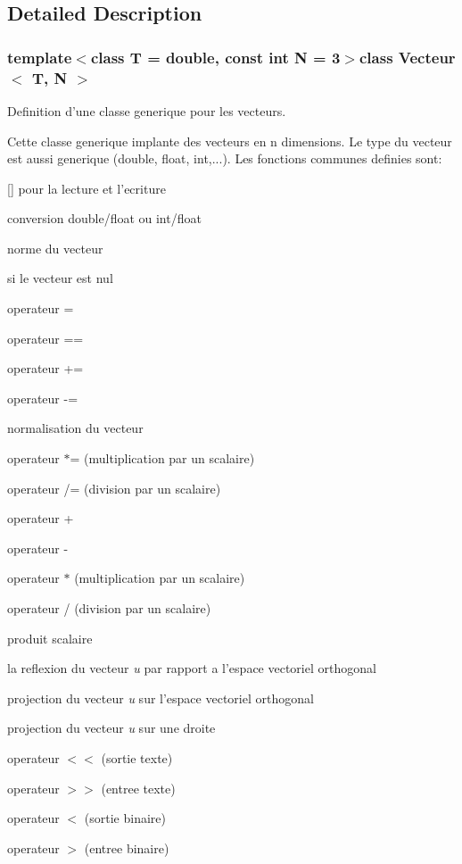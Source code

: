 \subsection{Detailed Description}
\subsubsection*{template$<$class T = double, const int N = 3$>$class Vecteur$<$ T, N $>$}

Definition d'une classe generique pour les vecteurs.

Cette classe generique implante des vecteurs en n dimensions. Le type du vecteur est aussi generique (double, float, int,...). Les fonctions communes definies sont\-:
\begin{DoxyItemize}
\item \mbox{[}\mbox{]} pour la lecture et l'ecriture
\item conversion double/float ou int/float
\item norme du vecteur
\item si le vecteur est nul
\item operateur =
\item operateur ==
\item operateur +=
\item operateur -\/=
\item normalisation du vecteur
\item operateur $\ast$= (multiplication par un scalaire)
\item operateur /= (division par un scalaire)
\item operateur +
\item operateur -\/
\item operateur $\ast$ (multiplication par un scalaire)
\item operateur / (division par un scalaire)
\item produit scalaire
\item la reflexion du vecteur {\itshape u} par rapport a l'espace vectoriel orthogonal
\item projection du vecteur {\itshape u} sur l'espace vectoriel orthogonal
\item projection du vecteur {\itshape u} sur une droite
\item operateur $<$$<$ (sortie texte)
\item operateur $>$$>$ (entree texte)
\item operateur $<$ (sortie binaire)
\item operateur $>$ (entree binaire)
\end{DoxyItemize}

